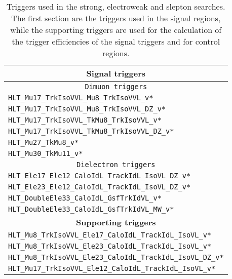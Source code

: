 \begin{table}[htbp!]
\def\arraystretch{1.2}
    \caption{Triggers used in the strong, electroweak and slepton searches. The first section are the triggers used in the signal regions, while the supporting triggers are used for the calculation of the trigger efficiencies of the signal triggers and for control regions.}
    \label{tab:triggers}
    \begin{center}
        \begin{tabular}{ l}
        \hline \hline
        \multicolumn{1}{c}{\textbf{Signal triggers} }             \\
        \hline 
        \multicolumn{1}{c}{\texttt{Dimuon triggers} }             \\
        \hline 
        \texttt{HLT\_Mu17\_TrkIsoVVL\_Mu8\_TrkIsoVVL\_v*}         \\
        \texttt{HLT\_Mu17\_TrkIsoVVL\_Mu8\_TrkIsoVVL\_DZ\_v*}      \\
        \texttt{HLT\_Mu17\_TrkIsoVVL\_TkMu8\_TrkIsoVVL\_v*}       \\
        \texttt{HLT\_Mu17\_TrkIsoVVL\_TkMu8\_TrkIsoVVL\_DZ\_v*}     \\
        \texttt{HLT\_Mu27\_TkMu8\_v*}                                \\ 
        \texttt{HLT\_Mu30\_TkMu11\_v*}                               \\
        \hline 
        \multicolumn{1}{c}{\texttt{Dielectron triggers} }             \\
        \hline 
        \texttt{HLT\_Ele17\_Ele12\_CaloIdL\_TrackIdL\_IsoVL\_DZ\_v*}   \\ 
        \texttt{HLT\_Ele23\_Ele12\_CaloIdL\_TrackIdL\_IsoVL\_DZ\_v*}    \\
        \texttt{HLT\_DoubleEle33\_CaloIdL\_GsfTrkIdVL\_v*}               \\
        \texttt{HLT\_DoubleEle33\_CaloIdL\_GsfTrkIdVL\_MW\_v*}               \\
        \hline 
        \multicolumn{1}{c}{\textbf{Supporting triggers}} \\
        \hline 
        \texttt{HLT\_Mu8\_TrkIsoVVL\_Ele17\_CaloIdL\_TrackIdL\_IsoVL\_v*} \\
        \texttt{HLT\_Mu8\_TrkIsoVVL\_Ele23\_CaloIdL\_TrackIdL\_IsoVL\_v*}    \\
        \texttt{HLT\_Mu8\_TrkIsoVVL\_Ele23\_CaloIdL\_TrackIdL\_IsoVL\_DZ\_v*}    \\
        \texttt{HLT\_Mu17\_TrkIsoVVL\_Ele12\_CaloIdL\_TrackIdL\_IsoVL\_v*}    \\

\end{tabular}
\end{center}
\end{table}

